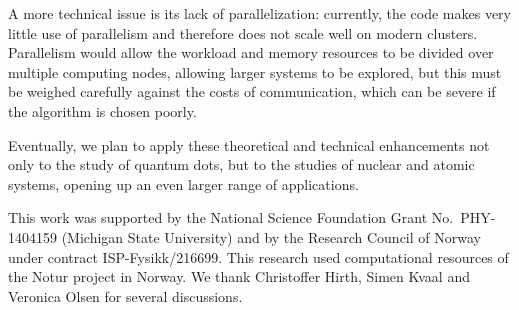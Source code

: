 A more technical issue is its lack of parallelization: currently, the code makes very little use of parallelism and therefore does not scale well on modern clusters.  Parallelism would allow the workload and memory resources to be divided over multiple computing nodes, allowing larger systems to be explored, but this must be weighed carefully against the costs of communication, which can be severe if the algorithm is chosen poorly.

Eventually, we plan to apply these theoretical and technical enhancements not only to the study of quantum dots, but to the studies of nuclear and atomic systems, opening up an even larger range of applications.

\begin{acknowledgments}
  This work was supported by the National Science Foundation Grant No.\ PHY-1404159 (Michigan State University) and by the Research Council of Norway under contract ISP-Fysikk/216699.  This research used computational resources of the Notur project in Norway.  We thank Christoffer Hirth, Simen Kvaal and Veronica Olsen for several discussions.
\end{acknowledgments}




